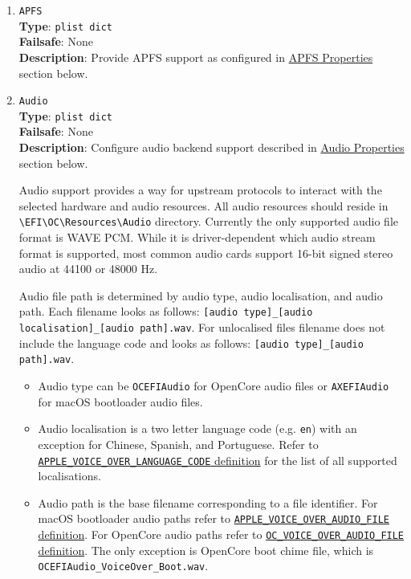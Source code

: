 \documentclass[]{article}
\providecommand{\tightlist}{%
  \setlength{\itemsep}{0pt}\setlength{\parskip}{0pt}}
\begin{document}
\begin{enumerate}
\item
  \texttt{APFS}\\
  \textbf{Type}: \texttt{plist\ dict}\\
  \textbf{Failsafe}: None\\
  \textbf{Description}: Provide APFS support as configured in
  \hyperref[uefiapfsprops]{APFS Properties} section below.

\item
  \texttt{Audio}\\
  \textbf{Type}: \texttt{plist\ dict}\\
  \textbf{Failsafe}: None\\
  \textbf{Description}: Configure audio backend support described
  in \hyperref[uefiaudioprops]{Audio Properties} section below.

  Audio support provides a way for upstream protocols to interact with the
  selected hardware and audio resources. All audio resources should reside
  in \texttt{\textbackslash EFI\textbackslash OC\textbackslash Resources\textbackslash Audio}
  directory. Currently the only supported audio file format is WAVE PCM. While it is
  driver-dependent which audio stream format is supported, most common audio cards
  support 16-bit signed stereo audio at 44100 or 48000 Hz.

  Audio file path is determined by audio type, audio localisation, and audio path. Each filename
  looks as follows: \texttt{[audio type]\_[audio localisation]\_[audio path].wav}. For unlocalised
  files filename does not include the language code and looks as follows:
  \texttt{[audio type]\_[audio path].wav}.

  \begin{itemize}
  \tightlist
  \item Audio type can be \texttt{OCEFIAudio} for OpenCore audio files or
    \texttt{AXEFIAudio} for macOS bootloader audio files.
  \item Audio localisation is a two letter language code (e.g. \texttt{en})
  with an exception for Chinese, Spanish, and Portuguese. Refer to
  \href{https://github.com/acidanthera/OpenCorePkg/blob/master/Include/Apple/Protocol/AppleVoiceOver.h}{\texttt{APPLE\_VOICE\_OVER\_LANGUAGE\_CODE} definition}
  for the list of all supported localisations.
  \item Audio path is the base filename corresponding to a file identifier. For macOS bootloader audio paths refer to
  \href{https://github.com/acidanthera/OpenCorePkg/blob/master/Include/Apple/Protocol/AppleVoiceOver.h}{\texttt{APPLE\_VOICE\_OVER\_AUDIO\_FILE} definition}.
  For OpenCore audio paths refer to
  \href{https://github.com/acidanthera/OpenCorePkg/blob/master/Include/Protocol/OcAudio.h}{\texttt{OC\_VOICE\_OVER\_AUDIO\_FILE} definition}.
  The only exception is OpenCore boot chime file, which is \texttt{OCEFIAudio\_VoiceOver\_Boot.wav}.
  \end{itemize}


\end{enumerate}
\end{document}
